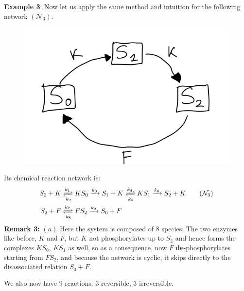 \textbf{Example 3}:
Now let us apply the same method and intuition for the following network $(\mathcal{N}_3)$.
\begin{figure}[H]
	\includegraphics[width=13cm]{math_pics/ex2-no-bifurcations.png}
	\centering
\end{figure}
Its chemical reaction network is:
\begin{align}\label{network3}
	S_0+K &\xrightleftharpoons[k_2]{k_1} KS_0 \xrightarrow{k_3} S_1 + K \xrightleftharpoons[k_5]{k_4} KS_1 \xrightarrow{k_6} S_2 + K \tag{$\mathcal{N}_3$}
	\\
	S_2+F &\xrightleftharpoons[k_8]{k_7} FS_2 \xrightarrow{k_9} S_0 + F \notag
\end{align}
\textbf{Remark 3:} $(a)$ Here the system is composed of $8$ species: The two enzymes like before, $K$ and $F$, but $K$ not phosphorylates up to $S_2$ and hence forms the complexes $KS_0$, $KS_1$ as well, so as a consequence, now $F$ \textbf{de}-phosphorylates starting from $FS_2$, and because the network is cyclic, it skips directly to the disassociated relation $S_0 + F$.

We also now have $9$ reactions: $3$ reversible, $3$ irreversible.

